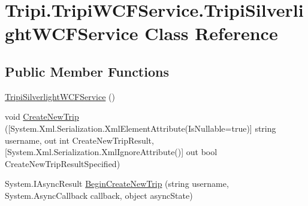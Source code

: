 \hypertarget{class_tripi_1_1_tripi_w_c_f_service_1_1_tripi_silverlight_w_c_f_service}{
\section{Tripi.TripiWCFService.TripiSilverlightWCFService Class Reference}
\label{class_tripi_1_1_tripi_w_c_f_service_1_1_tripi_silverlight_w_c_f_service}
}


 
\subsection*{Public Member Functions}
\begin{DoxyCompactItemize}
\item 
\hypertarget{class_tripi_1_1_tripi_w_c_f_service_1_1_tripi_silverlight_w_c_f_service_af47f3d1499fc0daac4597d8b1346ce96}{
\hyperlink{class_tripi_1_1_tripi_w_c_f_service_1_1_tripi_silverlight_w_c_f_service_af47f3d1499fc0daac4597d8b1346ce96}{TripiSilverlightWCFService} ()}
\label{class_tripi_1_1_tripi_w_c_f_service_1_1_tripi_silverlight_w_c_f_service_af47f3d1499fc0daac4597d8b1346ce96}

\begin{DoxyCompactList}\small\item\em \item\end{DoxyCompactList}\item 
\hypertarget{class_tripi_1_1_tripi_w_c_f_service_1_1_tripi_silverlight_w_c_f_service_a6bc9e4f0af2a4429f943299b3906858f}{
void \hyperlink{class_tripi_1_1_tripi_w_c_f_service_1_1_tripi_silverlight_w_c_f_service_a6bc9e4f0af2a4429f943299b3906858f}{CreateNewTrip} (\mbox{[}System.Xml.Serialization.XmlElementAttribute(IsNullable=true)\mbox{]} string username, out int CreateNewTripResult,\mbox{[}System.Xml.Serialization.XmlIgnoreAttribute()\mbox{]} out bool CreateNewTripResultSpecified)}
\label{class_tripi_1_1_tripi_w_c_f_service_1_1_tripi_silverlight_w_c_f_service_a6bc9e4f0af2a4429f943299b3906858f}

\begin{DoxyCompactList}\small\item\em \item\end{DoxyCompactList}\item 
\hypertarget{class_tripi_1_1_tripi_w_c_f_service_1_1_tripi_silverlight_w_c_f_service_adf38947d680d560517c2de8bddfdbe56}{
System.IAsyncResult \hyperlink{class_tripi_1_1_tripi_w_c_f_service_1_1_tripi_silverlight_w_c_f_service_adf38947d680d560517c2de8bddfdbe56}{BeginCreateNewTrip} (string username, System.AsyncCallback callback, object asyncState)}
\label{class_tripi_1_1_tripi_w_c_f_service_1_1_tripi_silverlight_w_c_f_service_adf38947d680d560517c2de8bddfdbe56}


\end{DoxyCompactItemize}
